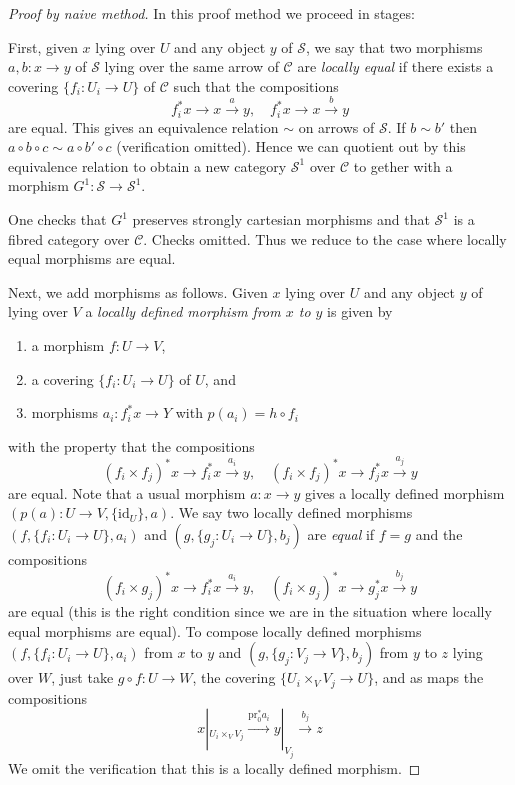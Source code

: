 \begin{proof}[Proof by naive method]
In this proof method we proceed in stages:

\medskip\noindent
First, given $x$ lying over $U$ and any object $y$ of
$\mathcal{S}$, we say that two morphisms
$a, b : x \to y$ of $\mathcal{S}$
lying over the same arrow of $\mathcal{C}$
are {\it locally equal}
if there exists a covering $\{f_i : U_i \to U\}$ of $\mathcal{C}$
such that the compositions
$$
f_i^*x \to x \xrightarrow{a} y,
\quad
f_i^*x \to x \xrightarrow{b} y
$$
are equal. This gives an equivalence relation $\sim$
on arrows of $\mathcal{S}$. If $b \sim b'$ then
$a \circ b \circ c \sim a \circ b' \circ c$ (verification omitted).
Hence we can quotient out by this equivalence relation to
obtain a new category $\mathcal{S}^1$ over $\mathcal{C}$
to gether with a morphism $G^1 : \mathcal{S} \to \mathcal{S}^1$.

\medskip\noindent
One checks that $G^1$ preserves strongly cartesian morphisms
and that $\mathcal{S}^1$ is a fibred category over $\mathcal{C}$.
Checks omitted. Thus we reduce to the case where locally equal
morphisms are equal.

\medskip\noindent
Next, we add morphisms as follows. Given
$x$ lying over $U$ and any object $y$ of lying over $V$
a {\it locally defined morphism from $x$ to $y$} is given by
\begin{enumerate}
\item a morphism $f : U \to V$,
\item a covering $\{f_i : U_i \to U\}$ of $U$, and
\item morphisms $a_i : f_i^*x \to Y$ with $p(a_i) = h \circ f_i$
\end{enumerate}
with the property that the compositions
$$
(f_i \times f_j)^*x \to f_i^*x \xrightarrow{a_i} y,
\quad
(f_i \times f_j)^*x \to f_j^*x \xrightarrow{a_j} y
$$
are equal. Note that a usual morphism $a : x \to y$ gives a locally
defined morphism $(p(a) : U \to V, \{\text{id}_U\}, a)$.
We say two locally defined morphisms
$(f, \{f_i : U_i \to U\}, a_i)$ and $(g, \{g_j : U_i \to U\}, b_j)$
are {\it equal} if $f = g$ and the compositions
$$
(f_i \times g_j)^*x \to f_i^*x \xrightarrow{a_i} y,
\quad
(f_i \times g_j)^*x \to g_j^*x \xrightarrow{b_j} y
$$
are equal (this is the right condition since we are in the
situation where locally equal morphisms are equal).
To compose locally defined morphisms
$(f, \{f_i : U_i \to U\}, a_i)$ from $x$ to $y$ and
$(g, \{g_j : V_j \to V\}, b_j)$ from $y$ to $z$ lying over $W$,
just take $g \circ f : U \to W$, the covering
$\{U_i \times_V V_j \to U\}$, and as maps the compositions
$$
x|_{U_i \times_V V_j}
\xrightarrow{\text{pr}_0^*a_i}
y|_{V_j}
\xrightarrow{b_j}
z
$$
We omit the verification that this is a locally defined morphism.


\end{proof}
